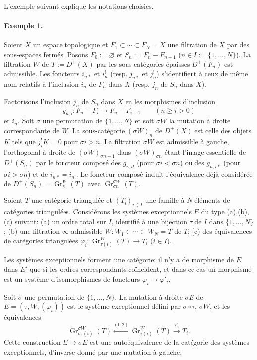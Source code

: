 \documentclass[11pt]{article}
\newcommand{\Gr}{\operatorname{Gr}}
\begin{document}
L'exemple suivant explique les notations choisies.

\paragraph{Exemple 1.} Soient $X$ un espace topologique et $F_1\subset\cdots\subset F_N=X$ une filtration de $X$ par des sous-espaces fermés. Posons $F_0:=\varnothing$ et $S_n:=F_n-F_{n-1}$ ($n\in I:=\{1,\ldots,N\}$). La filtration $W$ de $T:=D^+(X)$ par les sous-catégories épaisses $D^+(F_n)$ est admissible. Les foncteurs $i_{n*}$ et $i_n^!$ (resp. $j_{n*}$ et $j_n^!$) s'identifient à ceux de même nom relatifs à l'inclusion $i_n$ de $F_n$ dans $X$ (resp. $j_n$ de $S_n$ dans $X$).

Factorisons l'inclusion $j_n$ de $S_n$ dans $X$ en les morphismes d'inclusion
\[
 g_{n,i}:F_n-F_i\longrightarrow F_n-F_{i-1}\qquad(n\geq i>0)
\]
et $i_n$. Soit $\sigma$ une permutation de $\{1,\ldots,N\}$ et soit $\sigma W$ la mutation à droite correspondante de $W$. La sous-catégorie $(\sigma W)_n$ de $D^+(X)$ est celle des objets $K$ tels que $j_i^!K=0$ pour $\sigma i>n$. La filtration $\sigma W$ est admissible à gauche, l'orthogonal à droite de $(\sigma W)_{\sigma n-1}$ dans $(\sigma W)_{\sigma n}$ étant l'image essentielle de $D^+(S_n)$ par le foncteur composé des $g_{n,i!}$ (pour $\sigma i<\sigma n$) ou des $g_{n,i*}$ (pour $\sigma i>\sigma n$) et de $i_{n*}=i_{n!}$. Le foncteur composé induit l'équivalence déjà considérée de $D^+(S_n)=\Gr^W_n(T)$ avec $\Gr^{\sigma W}_{\sigma n}(T)$.

Soient $T$ une catégorie triangulée et $(T_i)_{i\in I}$ une famille à $N$ éléments de catégories triangulées. Considérons les systèmes exceptionnels $E$ du type (a),(b),(c) suivant: (a) un ordre total sur $I$, identifié à une bijection $\tau$ de $I$ dans $\{1,\ldots,N\}$; (b) une filtration $\infty$-admissible $W:W_1\subset\cdots\subset W_N=T$ de $T$; (c) des équivalences de catégories triangulées $\varphi_i:\Gr^W_{\tau(i)}(T)\to T_i$ ($i\in I$).

Les systèmes exceptionnels forment une catégorie: il n'y a de morphisme de $E$ dans $E'$ que si les ordres correspondants coïncident, et dans ce cas un morphisme est un système d'isomorphismes de foncteurs $\varphi_i\to\varphi'_i$.

Soit $\sigma$ une permutation de $\{1,\ldots,N\}$. La mutation à droite $\sigma E$ de $E=(\tau,W,(\varphi_i))$ est le système exceptionnel défini par $\sigma\circ\tau$, $\sigma W$, et les équivalences
\[
 \Gr^{\sigma W}_{\sigma\tau(i)}(T)\xleftarrow{(0.2)}\Gr^W_{\tau(i)}(T)\xrightarrow{\varphi_i}T_i.
\]
Cette construction $E\mapsto\sigma E$ est une autoéquivalence de la catégorie des systèmes exceptionnels, d'inverse donné par une mutation à gauche.
\end{document}
